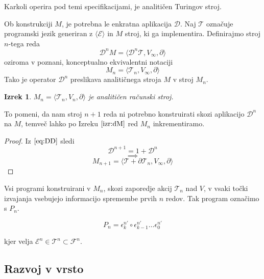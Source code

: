 \documentclass{article}
\newcommand{\II}{\mathbb{I}}
\newcommand{\E}{\mathcal{E}}
\newcommand{\T}{\mathcal{T}}
\newcommand{\F}{\mathcal{F}}
\newcommand{\D}{\partial}
\newcommand{\Dplus}{\mathcal{D}}
\newtheorem{izrek}{Izrek}[section]
\begin{document}
 Karkoli operira pod temi specifikacijami, je analitičen Turingov stroj.
 
 Ob konstrukciji $M$, je potrebna le enkratna aplikacija $\Dplus$. Naj $\T$ označuje programski jezik generiran z $\langle\E\rangle$ in $M$ stroj, ki ga implementira. Definirajmo stroj $n$-tega reda
 \begin{equation}\label{eq:Mprime}
	 \Dplus^n M=\langle\Dplus^n\T, V_\infty, \D\rangle
 \end{equation}
 oziroma v poznani, konceptualno ekvivalentni notaciji
  \begin{equation}\label{eq:M'}
 	 M_n=\langle\T_n, V_\infty, \D\rangle
  \end{equation}
  Tako je operator $\Dplus^n$ preslikava analitičnega stroja $M$ v stroj $M_n$.
  
  \begin{izrek}\label{izr:dM}
	$M_n=\langle\T_n, V_n, \D\rangle$ je analitičen računski stroj.
  \end{izrek}
  
  To pomeni, da nam stroj $n+1$ reda ni potrebno konstruirati skozi aplikacijo $\Dplus^n$ na $M$, temveč lahko po Izreku $\ref{izr:dM}$ red $M_{n}$ inkrementiramo.

\begin{proof}
	Iz $\eqref{eq:DD}$ sledi	
	$$\Dplus^{n+1}=1+\Dplus^n$$
	$$\implies$$
	$$M_{n+1}=\langle\T+\D\T_n,V_\infty,\D\rangle$$
\end{proof}
  
  Vsi programi konstruirani v $M_n$, skozi zaporedje akcij $\T_n$ nad $V$, v vsaki točki izvajanja vsebujejo informacijo spremembe prvih $n$ redov. Tak program označimo s $P_n$.
  
  \begin{equation}
  P_{n} = \epsilon^{n'}_k\circ\epsilon^{n'}_{k-1}\ldots\epsilon^{n'}_0
  \end{equation}
  
kjer velja $\E^n\in\T^n\subset\F^n$.
 
 
  \subsection{Razvoj v vrsto}
  
\end{document}
